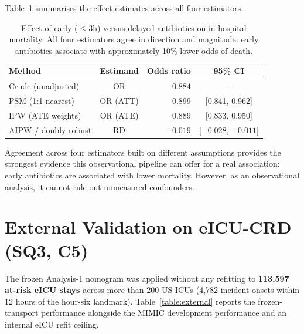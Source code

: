 Table~\ref{table:causal} summarises the effect estimates across all four
estimators.

\begin{table}[H]
    \centering
    \begin{tabular}{l|c|r|c}
        \hline
        \textbf{Method} & \textbf{Estimand} & \textbf{Odds ratio} & \textbf{95\% CI} \\
        \hline\hline
        Crude (unadjusted)  & OR       & 0.884 & --- \\
        PSM (1:1 nearest)   & OR (ATT) & 0.899 & [0.841, 0.962] \\
        IPW (ATE weights)   & OR (ATE) & 0.889 & [0.833, 0.950] \\
        AIPW / doubly robust & RD      & $-0.019$ & [$-0.028$, $-0.011$] \\
        \hline
    \end{tabular}
    \caption{Effect of early ($\le 3$h) versus delayed antibiotics on
    in-hospital mortality. All four estimators agree in direction and
    magnitude: early antibiotics associate with approximately 10\% lower
    odds of death.}
    \label{table:causal}
\end{table}

Agreement across four estimators built on different assumptions provides the
strongest evidence this observational pipeline can offer for a real
association: early antibiotics are associated with lower mortality. However,
as an observational analysis, it cannot rule out unmeasured confounders.

\section{External Validation on eICU-CRD (SQ3, C5)}
\label{sec:external_eval}

The frozen Analysis-1 nomogram was applied without any refitting to
\textbf{113{,}597 at-risk eICU stays} across more than 200 US ICUs (4{,}782
incident onsets within 12 hours of the hour-six landmark).
Table~\ref{table:external} reports the frozen-transport performance alongside
the MIMIC development performance and an internal eICU refit ceiling.

